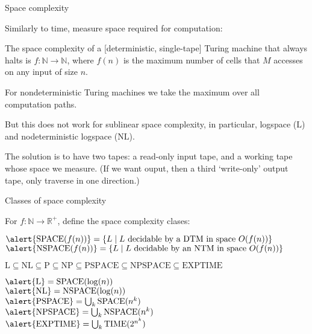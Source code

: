 \documentclass[handout]{beamer}
\begin{document}
    
\begin{frame}{Space complexity}

    Similarly to time, measure space required for computation:

    \begin{definition}
        The \alert{space complexity} of a [deterministic, single-tape] Turing machine that always halts is $f:\mathbb{N}\to \mathbb{N}$, where $f(n)$ is the maximum number of cells that $M$ accesses on any input of size $n$.

        For nondeterministic Turing machines we take the maximum over all computation paths.
    \end{definition}

    But this does not work for \alert{sublinear} space complexity, in particular, \alert{logspace} (\alert{$\mathrm{L}$}) and \alert{nodeterministic logspace} (\alert{$\mathrm{NL}$}).

    The solution is to have two tapes: a read-only input tape, and a working tape whose space we measure. (If we want ouput, then a third `write-only' output tape, only traverse in one direction.)

\end{frame}
    

\begin{frame}{Classes of space complexity}

    For $f: \mathbb{N}\to \mathbb{R}^+$, define the space complexity clases:

   
    $\alert{\mathrm{SPACE}(f(n))}=\{L\mid L \text{ decidable by a DTM in space }O(f(n))\}$\\ 
    $\alert{\mathrm{NSPACE}(f(n))}=\{L\mid L \text{ decidable by an NTM in space }O(f(n))\}$

    \medskip

    \begin{theorem}
        $\mathrm{L}\subseteq \mathrm{NL}\subseteq \mathrm{P} \subseteq \mathrm{NP} \subseteq \mathrm{PSPACE} \subseteq \mathrm{NPSPACE} \subseteq \mathrm{EXPTIME}$
    \end{theorem}
    
    $\alert{\mathrm{L}}=\mathrm{SPACE}(\log(n))$\\
    $\alert{\mathrm{NL}}=\mathrm{NSPACE}(\log(n))$\\
    $\alert{\mathrm{PSPACE}} = \bigcup_k \mathrm{SPACE}(n^k)$\\
    $\alert{\mathrm{NPSPACE}} = \bigcup_k \mathrm{NSPACE}(n^k)$\\
    $\alert{\mathrm{EXPTIME}} = \bigcup_k \mathrm{TIME}(2^{n^k})$

\end{frame}
\end{document}
